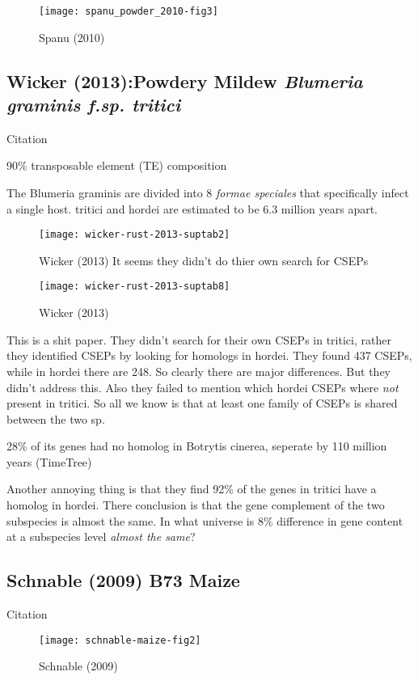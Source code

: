   \begin{figure}[!hbpt] \centering
    \texttt{[image: spanu\_powder\_2010-fig3]}
    \caption{Spanu (2010) \cite{spanu_genome_2010}}
  \end{figure}
  \FloatBarrier

\subsection{Wicker (2013):Powdery Mildew \textit{ Blumeria graminis f.sp. tritici}}

  Citation \cite{wicker_wheat_2013}

  90\% transposable element (TE) composition

  The Blumeria graminis are divided into 8 \textit{formae speciales} that
  specifically infect a single host. tritici and hordei are estimated to be
  6.3 million years apart. 

  \begin{figure}[!hbpt] \centering
    \texttt{[image: wicker-rust-2013-suptab2]}
    \caption{Wicker (2013) \cite{wicker_wheat_2013} It seems they didn't do thier own search for CSEPs}
  \end{figure}
  \FloatBarrier

  \begin{figure}[!hbpt] \centering
    \texttt{[image: wicker-rust-2013-suptab8]}
    \caption{Wicker (2013) \cite{wicker_wheat_2013} }
  \end{figure}
  \FloatBarrier

  This is a shit paper. They didn't search for their own CSEPs in tritici,
  rather they identified CSEPs by looking for homologs in hordei.  They found
  437 CSEPs, while in hordei there are 248. So clearly there are major
  differences. But they didn't address this. Also they failed to mention
  which hordei CSEPs where \textit{not} present in tritici. So all we know is
  that at least one family of CSEPs is shared between the two sp.

  28\% of its genes had no homolog in Botrytis cinerea, seperate by 110 million years (TimeTree)

  Another annoying thing is that they find 92\% of the genes in tritici have
  a homolog in hordei. There conclusion is that the gene complement of the
  two subspecies is almost the same. In what universe is 8\% difference in
  gene content at a subspecies level \textit{almost the same}?

\subsection{Schnable (2009) B73 Maize}
  Citation \cite{schnable_b73_2009}

  \begin{figure}[!hbpt] \centering
    \texttt{[image: schnable-maize-fig2]}
    \caption{Schnable (2009) \cite{schnable_b73_2009}}
  \end{figure}
  \FloatBarrier
